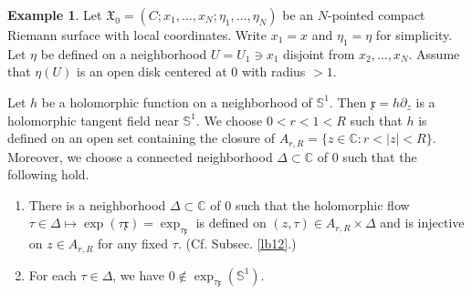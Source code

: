 \documentclass[11pt,b5paper,notitlepage]{article}
\theoremstyle{definition}
\newtheorem{eg}[df]{Example}
\theoremstyle{plain}
\newcommand{\fk}{\mathfrak}
\newcommand{\xk}{\mathfrak x}
\newcommand{\Cbb}{\mathbb C}
\newcommand{\Sbb}{{\mathbb S}}
\numberwithin{equation}{section}
\begin{document}
\begin{eg}\label{lb109}
Let $\fk X_0=(C;x_1,\dots,x_N;\eta_1,\dots,\eta_N)$ be an $N$-pointed compact Riemann surface with local coordinates. Write $x_1=x$ and $\eta_1=\eta$ for simplicity. Let $\eta$ be defined on a neighborhood $U=U_1\ni x_1$ disjoint from $x_2,\dots,x_N$. Assume that $\eta(U)$ is an open  disk centered at $0$ with radius $>1$.


Let $h$ be a holomorphic function on a neighborhood of $\Sbb^1$. Then $\xk=h\partial_z$ is a holomorphic tangent field near $\Sbb^1$. We choose $0<r<1<R$ such that $h$ is defined on an open set containing the closure of $A_{r,R}=\{z\in\Cbb:r<|z|<R\}$.  Moreover, we choose a connected neighborhood $\Delta\subset\Cbb$ of $0$ such that the following hold.
\begin{enumerate}
\item There is a neighborhood $\Delta\subset\Cbb$ of $0$ such that the holomorphic flow  $\tau\in\Delta\mapsto\exp(\tau \xk)=\exp_{\tau\xk}$ is defined on $(z,\tau)\in A_{r,R}\times\Delta$ and is injective on $z\in A_{r,R}$ for any fixed $\tau$.  (Cf. Subsec. \ref{lb12}.)
\item For each $\tau\in\Delta$, we have $0\notin\exp_{\tau\xk}(\Sbb^1)$.
\end{enumerate}


\end{eg}
\end{document}
